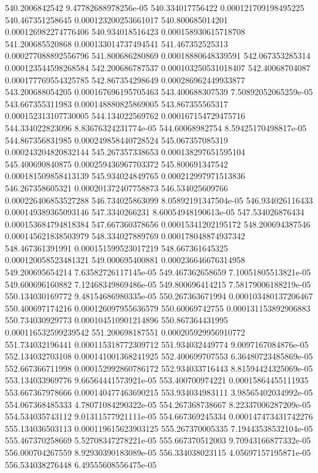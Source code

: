 {540.2006842542 9.47782688978256e-05
540.334017756422 0.000121709198495225
540.467351258645 0.000123200253661017
540.800685014201 0.000126982274776406
540.934018516423 0.000158930615718708
541.200685520868 0.000133014737494541
541.467352525313 0.000277088892556796
541.800686280869 0.00018880648339591
542.067353285314 0.000123544598268584
542.200686787537 0.000103250531018407
542.40068704087 0.000177769554325785
542.867354298649 0.000286962449933877
543.200688054205 0.000167696195705463
543.400688307539 7.50892052065259e-05
543.667355311983 0.000148880825869005
543.867355565317 0.000152313107730005
544.134022569762 0.000167154729475716
544.334022823096 8.83676324231774e-05
544.60068982754 8.59425170498817e-05
544.867356831985 0.000249858440728524
545.067357085319 0.000243204820832144
545.267357338653 0.000138297651595104
545.400690840875 0.000259436967703372
545.800691347542 0.000181509858413139
545.934024849765 0.000212997971513836
546.267358605321 0.000201372407758873
546.534025609766 0.000226406853527288
546.734025863099 8.05892191347504e-05
546.934026116433 0.000149389365093146
547.3340266231 8.60054948190613e-05
547.534026876434 0.000153684794818384
547.667360378656 0.00015341202195172
548.200694387546 0.000145621838503979
548.334027889769 0.000178048874937342
548.467361391991 0.000151599523017219
548.667361645325 0.000120058523481321
549.000695400881 0.000236646676314958
549.200695654214 7.63582726117145e-05
549.467362658659 7.10051805513821e-05
549.600696160882 7.12468349869486e-05
549.800696414215 7.58179006188219e-05
550.134030169772 9.48154686980335e-05
550.267363671994 0.000103480137206467
550.400697174216 0.000126097955636579
550.60069742755 0.000131153892906883
550.734030929773 0.000104510901214896
550.867364431995 0.000116532599239542
551.200698187551 0.000205929956910772
551.734032196441 0.000115318772309712
551.934032449774 9.0097167084876e-05
552.134032703108 0.000141001368241925
552.400699707553 6.36480723485869e-05
552.667366711998 0.000152992860786172
552.934033716443 8.81594424325069e-05
553.134033969776 9.66564441573921e-05
553.400700974221 0.00015864455111935
553.667367978666 0.000140477463690215
553.934034983111 3.98565402034992e-05
554.067368485333 4.78071084290322e-05
554.267368738667 8.22337006287209e-05
554.534035743112 9.01311577921111e-05
554.667369245334 0.000147473431742276
555.134036503113 0.000119615623903125
555.267370005335 7.19443538532104e-05
555.467370258669 5.52708347278221e-05
555.667370512003 9.70943166877332e-05
556.000704267559 8.92930390183089e-05
556.334038023115 4.05697157195871e-05
556.534038276448 6.49555608556475e-05
}
